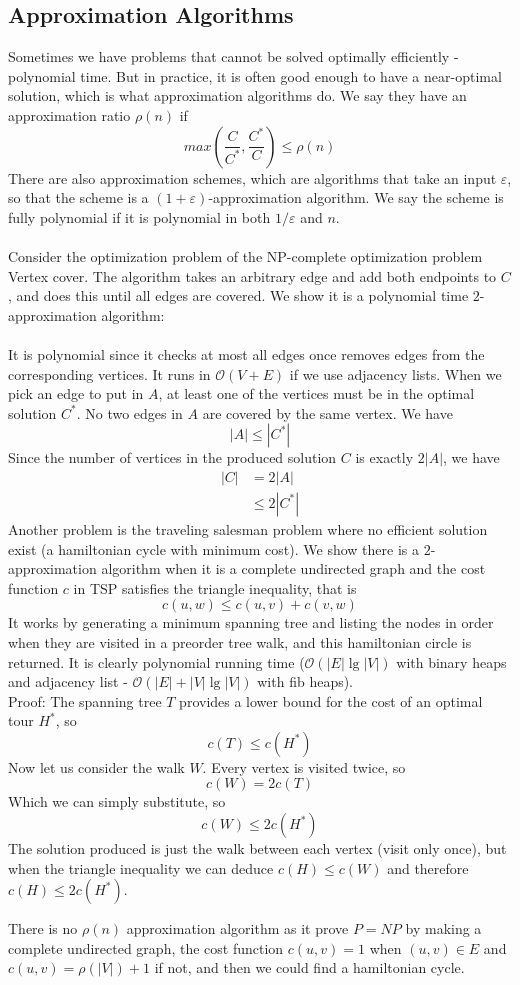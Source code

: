 \documentclass[a4paper]{article}
\author{Nikolaj Dybdahl Rathcke (rfq695)}
\begin{document}
\begin{center}
  \section*{Approximation Algorithms}
\end{center}
Sometimes we have problems that cannot be solved optimally efficiently - polynomial time. But in practice, it is often good enough to have a near-optimal solution, which is what approximation algorithms do. We say they have an approximation ratio $\rho (n)$ if
$$max\left( \frac{C}{C^*}, \frac{C^*}{C} \right)\leq \rho (n)$$
There are also approximation schemes, which are algorithms that take an input $\varepsilon$, so that the scheme is a $(1+\varepsilon)$-approximation algorithm. We say the scheme is fully polynomial if it is polynomial in both $1/\varepsilon$ and $n$. \\
\\
Consider the optimization problem of the NP-complete optimization problem Vertex cover. The algorithm takes an arbitrary edge and add both endpoints to $C$, and does this until all edges are covered. We show it is a polynomial time $2$-approximation algorithm:\\
\\
It is polynomial since it checks at most all edges once removes edges from the corresponding vertices. It runs in $\mathcal{O}(V + E)$ if we use adjacency lists. When we pick an edge to put in $A$, at least one of the vertices must be in the optimal solution $C^*$. No two edges in $A$ are covered by the same vertex. We have
$$|A|\leq |C^*|$$
Since the number of vertices in the produced solution $C$ is exactly $2|A|$, we have
\begin{align*}
|C|&=2|A| \\
&\leq 2|C^*|
\end{align*}
Another problem is the traveling salesman problem where no efficient solution exist (a hamiltonian cycle with minimum cost). We show there is a $2$-approximation algorithm when it is a complete undirected graph and the cost function $c$ in TSP satisfies the triangle inequality, that is
$$c(u,w)\leq c(u,v)+c(v,w)$$
It works by generating a minimum spanning tree and listing the nodes in order when they are visited in a preorder tree walk, and this hamiltonian circle is returned. It is clearly polynomial running time ($\mathcal{O}(|E|\lg |V|)$ with binary heaps and adjacency list - $\mathcal{O}(|E|+|V|\lg |V|)$ with fib heaps). \\
Proof: The spanning tree $T$ provides a lower bound for the cost of an optimal tour $H^*$, so
$$c(T)\leq c(H^*)$$
Now let us consider the walk $W$. Every vertex is visited twice, so
$$c(W)=2c(T)$$
Which we can simply substitute, so
$$c(W)\leq 2c(H^*)$$
The solution produced is just the walk between each vertex (visit only once), but when the triangle inequality we can deduce $c(H)\leq c(W)$ and therefore $c(H)\leq 2c(H^*)$.

There is no $\rho(n)$ approximation algorithm as it prove $P=NP$ by making a complete undirected graph, the cost function $c(u,v)=1$ when $(u,v)\in E$ and $c(u,v)=\rho(|V|)+1$ if not, and then we could find a hamiltonian cycle.
\end{document}
